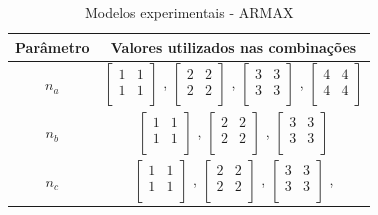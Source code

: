 \begin{table}[h]
	\centering
	\caption{Modelos experimentais - ARMAX}
	\label{tab:tclabsp-models-armax}
	\begin{tabular}{c|c} \toprule
		{Parâmetro}		&	{Valores utilizados nas combinações}									\\ \midrule
		$n_a$			&
							$ \begin{bmatrix}	1	&	1	\\	1	&	1	\\	\end{bmatrix} $	,		
							$ \begin{bmatrix}	2	&	2	\\	2	&	2	\\	\end{bmatrix} $	,		
							$ \begin{bmatrix}	3	&	3	\\	3	&	3	\\	\end{bmatrix} $	,		
							$ \begin{bmatrix}	4	&	4	\\	4	&	4	\\	\end{bmatrix} $		\\ \midrule
		$n_b$			&
							$ \begin{bmatrix}	1	&	1	\\	1	&	1	\\	\end{bmatrix} $	,		
							$ \begin{bmatrix}	2	&	2	\\	2	&	2	\\	\end{bmatrix} $	,		
							$ \begin{bmatrix}	3	&	3	\\	3	&	3	\\	\end{bmatrix} $		\\ \midrule
		$n_c$			&
							$ \begin{bmatrix}	1	&	1	\\	1	&	1	\\	\end{bmatrix} $	,		
							$ \begin{bmatrix}	2	&	2	\\	2	&	2	\\	\end{bmatrix} $	,		
							$ \begin{bmatrix}	3	&	3	\\	3	&	3	\\	\end{bmatrix} $	,		

\end{tabular}
\end{table}
